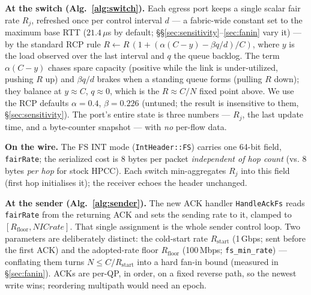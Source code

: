 \documentclass[conference]{IEEEtran}
\renewcommand{\paragraph}[1]{\par\smallskip\noindent\textbf{#1}\hspace{0.5em}\ignorespaces}
\begin{document}
\paragraph{At the switch (Alg.~\ref{alg:switch}).} Each egress port keeps a single scalar fair
rate $R_j$, refreshed once per control interval $d$ --- a fabric-wide constant set to the
maximum base RTT ($21.4\,\mu$s by default; \S\S\ref{sec:sensitivity}--\ref{sec:fanin}
vary it) --- by the standard RCP rule
$R \leftarrow R\,(1 + (\alpha(C - y) - \beta q/d)/C)$, where $y$ is the load observed over the
last interval and $q$ the queue backlog. The term $\alpha(C - y)$ chases spare capacity (positive
while the link is under-utilized, pushing $R$ up) and $\beta q/d$ brakes when a standing queue
forms (pulling $R$ down); they balance at $y \approx C$, $q \approx 0$, which is the
$R \approx C/N$ fixed point above. We use the RCP defaults $\alpha = 0.4$, $\beta = 0.226$
(untuned; the result is insensitive to them, \S\ref{sec:sensitivity}). The port's entire state is
three numbers --- $R_j$, the last update time, and a byte-counter snapshot --- with \emph{no}
per-flow data.

\paragraph{On the wire.} The FS INT mode (\texttt{IntHeader::FS}) carries one 64-bit field,
\texttt{fairRate}; the serialized cost is 8 bytes per packet \emph{independent of hop count}
(vs. 8 bytes \emph{per hop} for stock HPCC). Each switch min-aggregates $R_j$ into this field
(first hop initialises it); the receiver echoes the header unchanged.

\paragraph{At the sender (Alg.~\ref{alg:sender}).} The new ACK handler \texttt{HandleAckFs} reads
\texttt{fairRate} from the returning ACK and sets the sending rate to it, clamped to
$[R_{\mathrm{floor}}, \mathit{NICrate}]$. That single assignment is the whole sender control
loop. Two parameters are deliberately distinct: the cold-start rate $R_{\mathrm{start}}$
(1\,Gbps; sent before the first ACK) and the adopted-rate floor $R_{\mathrm{floor}}$
(100\,Mbps; \texttt{fs\_min\_rate}) --- conflating them turns $N \le C/R_{\mathrm{start}}$
into a hard fan-in bound (measured in \S\ref{sec:fanin}). ACKs are per-QP, in order, on a
fixed reverse path, so the newest write wins; reordering multipath would need an epoch.
\end{document}

